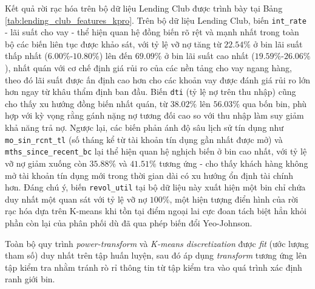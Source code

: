 Kết quả rời rạc hóa trên bộ dữ liệu Lending Club được trình bày tại Bảng \ref{tab:lending_club_features_kpro}. Trên bộ dữ liệu Lending Club, biến \texttt{int\_rate} - lãi suất cho vay - thể hiện quan hệ đồng biến rõ rệt và mạnh nhất trong toàn bộ các biến liên tục được khảo sát, với tỷ lệ vỡ nợ tăng từ $22.54\%$ ở bin lãi suất thấp nhất ($6.00\%$-$10.80\%$) lên đến $69.09\%$ ở bin lãi suất cao nhất ($19.59\%$-$26.06\%$), nhất quán với cơ chế định giá rủi ro của các nền tảng cho vay ngang hàng, theo đó lãi suất được ấn định cao hơn cho các khoản vay được đánh giá rủi ro lớn hơn ngay từ khâu thẩm định ban đầu. Biến \texttt{dti} (tỷ lệ nợ trên thu nhập) cũng cho thấy xu hướng đồng biến nhất quán, từ $38.02\%$ lên $56.03\%$ qua bốn bin, phù hợp với kỳ vọng rằng gánh nặng nợ tương đối cao so với thu nhập làm suy giảm khả năng trả nợ. Ngược lại, các biến phản ánh độ sâu lịch sử tín dụng như \texttt{mo\_sin\_rcnt\_tl} (số tháng kể từ tài khoản tín dụng gần nhất được mở) và \texttt{mths\_since\_recent\_bc} lại thể hiện quan hệ nghịch biến ở bin cao nhất, với tỷ lệ vỡ nợ giảm xuống còn $35.88\%$ và $41.51\%$ tương ứng - cho thấy khách hàng không mở tài khoản tín dụng mới trong thời gian dài có xu hướng ổn định tài chính hơn. Đáng chú ý, biến \texttt{revol\_util} tại bộ dữ liệu này xuất hiện một bin chỉ chứa duy nhất một quan sát với tỷ lệ vỡ nợ $100\%$, một hiện tượng điển hình của rời rạc hóa dựa trên K-means khi tồn tại điểm ngoại lai cực đoan tách biệt hẳn khỏi phần còn lại của phân phối dù đã qua phép biến đổi Yeo-Johnson.

Toàn bộ quy trình \textit{power-transform} và \textit{K-means discretization} được \textit{fit} (ước lượng tham số) duy nhất trên tập huấn luyện, sau đó áp dụng \textit{transform} tương ứng lên tập kiểm tra nhằm tránh rò rỉ thông tin từ tập kiểm tra vào quá trình xác định ranh giới bin.

